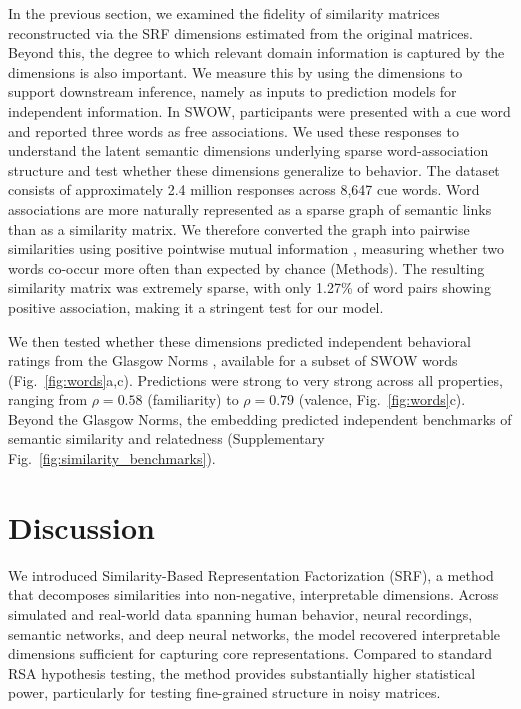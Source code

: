 \documentclass{article}
\begin{document}

In the previous section, we examined the fidelity of similarity matrices reconstructed via the SRF dimensions estimated from the original matrices. Beyond this, the degree to which relevant domain information is captured by the dimensions is also important. We measure this by using the dimensions to support downstream inference, namely as inputs to prediction models for independent information. In SWOW, participants were presented with a cue word and reported three words as free associations. We used these responses to understand the latent semantic dimensions underlying sparse word-association structure and test whether these dimensions generalize to behavior. The dataset consists of approximately 2.4 million responses across 8{,}647 cue words. Word associations are more naturally represented as a sparse graph of semantic links than as a similarity matrix. We therefore converted the graph into pairwise similarities using positive pointwise mutual information \citep{Church1990}, measuring whether two words co-occur more often than expected by chance (Methods). The resulting similarity matrix was extremely sparse, with only 1.27\% of word pairs showing positive association, making it a stringent test for our model.

We then tested whether these dimensions predicted independent behavioral ratings from the Glasgow Norms \citep{Scott2019}, available for a subset of SWOW words (Fig.~\ref{fig:words}a,c). Predictions were strong to very strong across all properties, ranging from $\rho = 0.58$ (familiarity) to $\rho = 0.79$ (valence, Fig.~\ref{fig:words}c). Beyond the Glasgow Norms, the embedding predicted independent benchmarks of semantic similarity and relatedness (Supplementary Fig.~\ref{fig:similarity_benchmarks}).


\section{Discussion}

We introduced Similarity-Based Representation Factorization (SRF), a method that decomposes similarities into non-negative, interpretable dimensions. Across simulated and real-world data spanning human behavior, neural recordings, semantic networks, and deep neural networks, the model recovered interpretable dimensions sufficient for capturing core representations. Compared to standard RSA hypothesis testing, the method provides substantially higher statistical power, particularly for testing fine-grained structure in noisy matrices.
\end{document}
